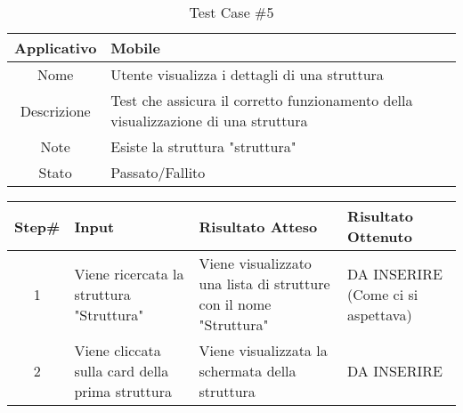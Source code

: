 
\begin{table}[H]
    \centering
    \footnotesize
    \caption{Test Case \#5}
    \begin{tabularx}{\textwidth}{|c|X|}
        \hline
        Applicativo & Mobile\\
        \hline
        Nome & Utente visualizza i dettagli di una struttura  \\
        \hline
        Descrizione & Test che assicura il corretto funzionamento della visualizzazione di una struttura\\
        \hline
        Note & Esiste la struttura "struttura"\\
        \hline
        Stato & Passato/Fallito\\
        \hline

    \end{tabularx}
    \setlength{\tabcolsep}{8pt}
    \renewcommand{\arraystretch}{1.5}
\end{table}

\begin{table}[H]
    \footnotesize
    \begin{tabularx}{\textwidth}{|c|X|X|X|}
        \hline
        Step\# & Input & Risultato Atteso & Risultato Ottenuto \\
        \hline
         1 & Viene ricercata la struttura "Struttura"
         & Viene visualizzato una lista di strutture con il nome "Struttura"
         &DA INSERIRE (Come ci si aspettava)\\
          \hline
        2 & Viene cliccata sulla card della prima struttura
        & Viene visualizzata la schermata della struttura
        & DA INSERIRE\\
\hline
    \end{tabularx}
\end{table}
    
       
